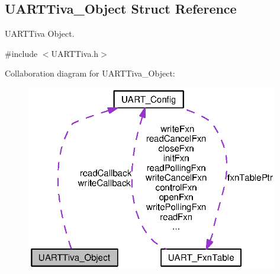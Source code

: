 \subsection{U\-A\-R\-T\-Tiva\-\_\-\-Object Struct Reference}
\label{struct_u_a_r_t_tiva___object}


U\-A\-R\-T\-Tiva Object.  




{\ttfamily \#include $<$U\-A\-R\-T\-Tiva.\-h$>$}



Collaboration diagram for U\-A\-R\-T\-Tiva\-\_\-\-Object\-:
\nopagebreak
\begin{figure}[H]
\begin{center}
\leavevmode
\includegraphics[width=313pt]{struct_u_a_r_t_tiva___object__coll__graph}
\end{center}
\end{figure}
